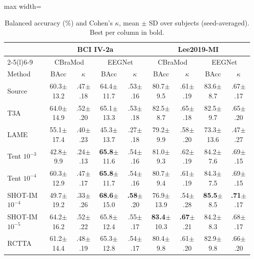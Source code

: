\documentclass[preprint,12pt]{elsarticle}
\begin{document}
\begin{table}[!htbp]
\centering
\caption{Balanced accuracy (\%) and Cohen's $\kappa$, mean $\pm$ SD over subjects (seed-averaged). Best per column in bold.}
\label{tab:kappa}
\setlength{\tabcolsep}{5pt}
\footnotesize
\begin{adjustbox}{max width=\textwidth}
\begin{tabular}{@{}l cc cc cc cc@{}}
\toprule
& \multicolumn{4}{c}{BCI IV-2a} & \multicolumn{4}{c}{Lee2019-MI}\\
\cmidrule(lr){2-5}\cmidrule(l){6-9}
& \multicolumn{2}{c}{CBraMod} & \multicolumn{2}{c}{EEGNet} & \multicolumn{2}{c}{CBraMod} & \multicolumn{2}{c}{EEGNet}\\
Method & BAcc & $\kappa$ & BAcc & $\kappa$ & BAcc & $\kappa$ & BAcc & $\kappa$\\
\midrule
Source & 60.3{\tiny$\pm$13.2} & .47{\tiny$\pm$.18} & 64.4{\tiny$\pm$11.7} & .53{\tiny$\pm$.16} & 80.7{\tiny$\pm$9.5} & .61{\tiny$\pm$.19} & 83.6{\tiny$\pm$8.7} & .67{\tiny$\pm$.17}\\
T3A & 64.0{\tiny$\pm$14.9} & .52{\tiny$\pm$.20} & 65.1{\tiny$\pm$13.3} & .53{\tiny$\pm$.18} & 82.5{\tiny$\pm$8.7} & .65{\tiny$\pm$.18} & 82.5{\tiny$\pm$9.7} & .65{\tiny$\pm$.20}\\
LAME & 55.1{\tiny$\pm$17.4} & .40{\tiny$\pm$.23} & 45.3{\tiny$\pm$13.7} & .27{\tiny$\pm$.18} & 79.2{\tiny$\pm$9.9} & .58{\tiny$\pm$.20} & 73.3{\tiny$\pm$13.6} & .47{\tiny$\pm$.27}\\
Tent $10^{-3}$ & 42.8{\tiny$\pm$9.9} & .24{\tiny$\pm$.13} & \textbf{65.8}{\tiny$\pm$11.6} & .54{\tiny$\pm$.16} & 81.0{\tiny$\pm$9.3} & .62{\tiny$\pm$.19} & 84.2{\tiny$\pm$7.6} & .69{\tiny$\pm$.15}\\
Tent $10^{-4}$ & 60.3{\tiny$\pm$12.9} & .47{\tiny$\pm$.17} & \textbf{65.8}{\tiny$\pm$11.7} & .54{\tiny$\pm$.16} & 80.7{\tiny$\pm$9.4} & .61{\tiny$\pm$.19} & 84.3{\tiny$\pm$7.5} & .69{\tiny$\pm$.15}\\
SHOT-IM $10^{-4}$ & 49.7{\tiny$\pm$19.2} & .33{\tiny$\pm$.26} & \textbf{68.6}{\tiny$\pm$15.0} & \textbf{.58}{\tiny$\pm$.20} & 76.9{\tiny$\pm$13.9} & .54{\tiny$\pm$.28} & \textbf{85.5}{\tiny$\pm$8.5} & \textbf{.71}{\tiny$\pm$.17}\\
SHOT-IM $10^{-5}$ & 64.2{\tiny$\pm$16.2} & .52{\tiny$\pm$.22} & 65.8{\tiny$\pm$12.4} & .55{\tiny$\pm$.17} & \textbf{83.4}{\tiny$\pm$10.3} & \textbf{.67}{\tiny$\pm$.21} & 84.2{\tiny$\pm$8.3} & .68{\tiny$\pm$.17}\\
RCTTA & 61.2{\tiny$\pm$14.4} & .48{\tiny$\pm$.19} & 65.3{\tiny$\pm$12.8} & .54{\tiny$\pm$.17} & 80.4{\tiny$\pm$9.8} & .61{\tiny$\pm$.20} & 82.9{\tiny$\pm$9.8} & .66{\tiny$\pm$.20}\\

\end{tabular}
\end{adjustbox}
\end{table}
\end{document}

